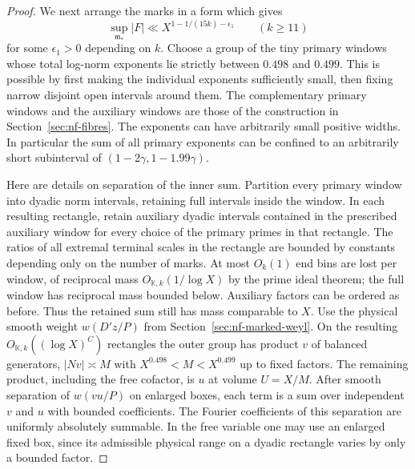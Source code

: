 \documentclass[11pt,letterpaper]{article}
\theoremstyle{definition}
\numberwithin{equation}{section}
\begin{document}
\begin{proof}
We next arrange the marks in a form which gives
\begin{equation}\label{eq:nf-self-sup}
       \sup_{\mathfrak m_*}|F|\ll X^{1-1/(15k)-\epsilon_1}
                     \qquad(k\ge11)
\end{equation}
for some $\epsilon_1>0$ depending on $k$. Choose a group of the
tiny primary windows whose total log-norm exponents lie strictly
between $0.498$ and $0.499$. This is possible by first making
the individual exponents sufficiently small, then fixing narrow
disjoint open intervals around them. The complementary primary
windows and the auxiliary windows are those of the construction
in Section~\ref{sec:nf-fibres}. The exponents can have arbitrarily
small positive widths. In particular the sum of all primary
exponents can be confined to an arbitrarily short subinterval
of $(1-2\gamma,1-1.99\gamma)$.

Here are details on separation of the inner sum. Partition every
primary window into dyadic norm intervals, retaining full intervals
inside the window. In each resulting rectangle, retain auxiliary
dyadic intervals contained in the prescribed auxiliary window
for every choice of the primary primes in that rectangle.
The ratios of all extremal terminal scales in the rectangle are
bounded by constants depending only on the number of marks.
At most $O_k(1)$ end bins are lost per window, of reciprocal mass
$O_{\mathbb K,k}(1/\log X)$ by the prime ideal theorem; the full
window has reciprocal mass bounded below. Auxiliary factors can be
ordered as before. Thus the retained sum still has mass comparable
to $X$. Use the physical smooth weight $w(D'z/P)$ from
Section~\ref{sec:nf-marked-weyl}. On the resulting
$O_{\mathbb K,k}((\log X)^C)$ rectangles the outer group has
product $v$ of balanced generators, $|Nv|\asymp M$ with
$X^{0.498}<M<X^{0.499}$ up to fixed factors. The remaining product,
including the free cofactor, is $u$ at volume $U=X/M$.
After smooth separation of $w(vu/P)$ on enlarged boxes, each
term is a sum over independent $v$ and $u$ with bounded coefficients.
The Fourier coefficients of this separation are uniformly absolutely
summable. In the free variable one may use an enlarged fixed box,
since its admissible physical range on a dyadic rectangle varies
by only a bounded factor.


\end{proof}
\end{document}
